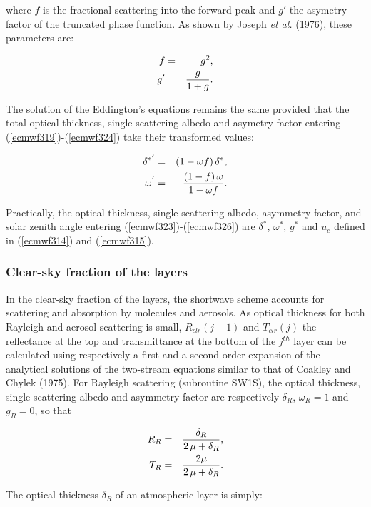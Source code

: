 \noindent where $f$ is the fractional scattering into the forward peak and $g'$ the asymetry factor of the truncated phase function. As shown by Joseph {\em et al.} (1976), these parameters are:

\medskip
\begin{eqnarray}\label{ecmwf325}
f  &=& g^2, \cr
g' &=& \frac{g}{1+g}.
\end{eqnarray}
\medskip

The solution of the Eddington's equations remains the same provided that the total optical thickness, single scattering albedo and asymetry factor entering (\ref{ecmwf319})-(\ref{ecmwf324}) take their transformed values:

\medskip
\begin{eqnarray}\label{ecmwf326}
\delta^{*'} &=& (1 - \omega f) \, \delta^{*}, \cr
\omega^{'}  &=& \frac{(1 - f) \, \omega}{1 - \omega f}.
\end{eqnarray}

Practically, the optical thickness, single scattering albedo, asymmetry factor,
and solar zenith angle entering (\ref{ecmwf323})-(\ref{ecmwf326}) are $\delta^{*}$, $\omega^{*}$, $g^{*}$ and $u_e$ defined in (\ref{ecmwf314}) and (\ref{ecmwf315}).

%
\subsubsection{Clear-sky fraction of the layers}
%


In the clear-sky fraction of the layers, the shortwave scheme accounts for scattering and absorption by molecules and aerosols. As optical thickness for both Rayleigh and aerosol scattering is small, $R_{clr}(j-1)$ and $T_{clr}(j)$ the reflectance at the top and transmittance at the bottom of the $j^{th}$ layer can be calculated using respectively a first and a second-order expansion of the analytical solutions of the two-stream equations similar to that of Coakley and Chylek (1975). For Rayleigh scattering (subroutine SW1S), the optical thickness, single scattering albedo and asymmetry factor are respectively $\delta_R$, $\omega_R = 1$ and $g_R = 0$, so that

\medskip
\begin{eqnarray}\label{ecmwf327}
R_R &=& \frac{\delta_R}{2 \, \mu + \delta_R}, \cr
T_R &=& \frac{2 \mu}{2 \, \mu + \delta_R}.
\end{eqnarray}
\medskip

The optical thickness $\delta_R$ of an atmospheric layer is simply:

